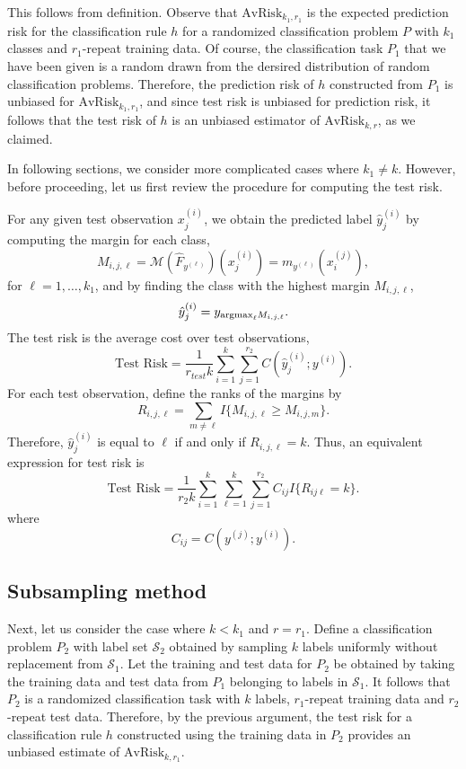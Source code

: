 This follows from definition.  Observe that $\text{AvRisk}_{k_1,r_1}$
is the expected prediction risk for the classification rule $h$ for a
randomized classification problem $P$ with $k_1$ classes and
$r_1$-repeat training data.  Of course, the classification task $P_1$
that we have been given is a random drawn from the dersired
distribution of random classification problems.  Therefore, the
prediction risk of $h$ constructed from $P_1$ is unbiased for
$\text{AvRisk}_{k_1, r_1}$, and since test risk is unbiased for
prediction risk, it follows that the test risk of $h$ is an
unbiased estimator of $\text{AvRisk}_{k,r}$, as we claimed.

In following sections, we consider more complicated cases where $k_1
\neq k$.  However, before proceeding, let us first review the
procedure for computing the test risk.

For any given test observation $x_j^{(i)}$, we obtain the predicted
label $\hat{y}_j^{(i)}$ by computing the margin for each class,
\[
M_{i,j,\ell} = \mathcal{M}(\hat{F}_{y^{(\ell)}})(x_j^{(i)}) =  m_{y^{(\ell)}}(x_i^{(j)}),
\]
for $\ell = 1,\hdots, k_1$,
and by finding the class with the highest margin $M_{i, j, \ell}$,
\[
\hat{y}_j^{(i)} = y_{\text{argmax}_\ell M_{i, j, \ell}}.
\]
The test risk is the average cost over test observations,
\begin{equation}
\text{Test Risk} = \frac{1}{r_{test}k} \sum_{i=1}^k \sum_{j=1}^{r_2} C(\hat{y}_j^{(i)}; y^{(i)}).
\end{equation}
For each test observation, define the ranks of the margins by
\[
R_{i,j,\ell} = \sum_{m \neq \ell} I\{M_{i,j,\ell} \geq M_{i, j, m}\}.
\]
Therefore, $\hat{y}_j^{(i)}$ is equal to $\ell$ if and only if $R_{i,j,\ell} = k$.
Thus, an equivalent expression for test risk is
\begin{equation}\label{eq:test_risk}
\text{Test Risk} = \frac{1}{r_2 k} \sum_{i=1}^k \sum_{\ell=1}^k \sum_{j=1}^{r_2} C_{ij} I\{R_{ij\ell} = k\}.
\end{equation}
where
\[
C_{ij} = C(y^{(j)}; y^{(i)}).
\]


\subsection{Subsampling method}

Next, let us consider the case where $k < k_1$ and $r=r_1$.  Define a
classification problem $P_2$ with label set $\mathcal{S}_2$ obtained
by sampling $k$ labels uniformly without replacement from
$\mathcal{S}_1$.  Let the training and test data for $P_2$ be obtained
by taking the training data and test data from $P_1$ belonging to
labels in $\mathcal{S}_1$.  It follows that $P_2$ is a randomized
classification task with $k$ labels, $r_1$-repeat training data and
$r_2$-repeat test data.  Therefore, by the previous argument, the test
risk for a classification rule $h$ constructed using the training data
in $P_2$ provides an unbiased estimate of $\text{AvRisk}_{k, r_1}$.

